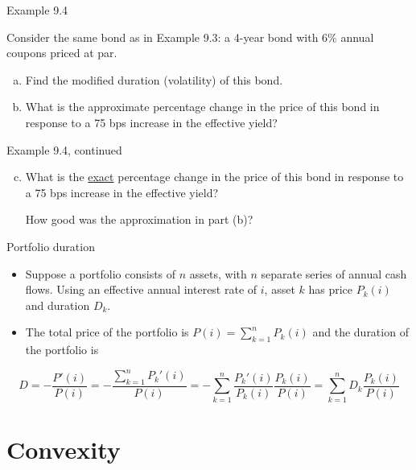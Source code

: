 \documentclass{beamer}
\begin{document}
\begin{frame}{Example 9.4}

Consider the same bond as in Example 9.3: a 4-year bond with 6\% annual coupons priced at par.
\begin{enumerate}[a)]
\item Find the modified duration (volatility) of this bond.
\vspace{6em}
\item What is the approximate percentage change in the price of this bond in response to a 75 bps increase in the effective yield?
\end{enumerate}

\vfill
\end{frame}

\begin{frame}{Example 9.4, continued}

\begin{enumerate}[a)]
\setcounter{enumi}{2}
\item What is the \underline{exact} percentage change in the price of this bond in response to a 75 bps increase in the effective yield?

\vspace{8em}
How good was the approximation in part (b)?
\end{enumerate}

\vfill
\end{frame}

\begin{frame}{Portfolio duration}

\begin{itemize}
\item Suppose a portfolio consists of $n$ assets, with $n$ separate series of annual cash flows. Using an effective annual interest rate of $i$, asset $k$ has price $P_k(i)$ and duration $D_k$.
\medskip
\item The total price of the portfolio is $P(i) = \sum_{k=1}^{n} P_k(i)$ and the duration of the portfolio is
\end{itemize}
\[
D = -\frac{P'(i)}{P(i)} = -\frac{\sum_{k=1}^{n} P_k'(i)}{P(i)} = -\sum_{k=1}^{n} \frac{P_k'(i)}{P_k(i)} \frac{P_k(i)}{P(i)} = \sum_{k=1}^{n} D_k \frac{P_k(i)}{P(i)}
\]

\end{frame}

\section{Convexity}
\end{document}
